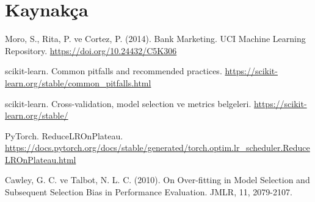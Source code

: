 \documentclass[10.5pt,a4paper]{article}
\begin{document}
\section*{Kaynakça}
\small
\begin{enumerate}[label={[\arabic*]}]
\item Moro, S., Rita, P. ve Cortez, P. (2014). Bank Marketing. UCI Machine Learning Repository. \url{https://doi.org/10.24432/C5K306}
\item scikit-learn. Common pitfalls and recommended practices. \url{https://scikit-learn.org/stable/common_pitfalls.html}
\item scikit-learn. Cross-validation, model selection ve metrics belgeleri. \url{https://scikit-learn.org/stable/}
\item PyTorch. ReduceLROnPlateau. \url{https://docs.pytorch.org/docs/stable/generated/torch.optim.lr_scheduler.ReduceLROnPlateau.html}
\item Cawley, G. C. ve Talbot, N. L. C. (2010). On Over-fitting in Model Selection and Subsequent Selection Bias in Performance Evaluation. JMLR, 11, 2079-2107.
\end{enumerate}
\end{document}

